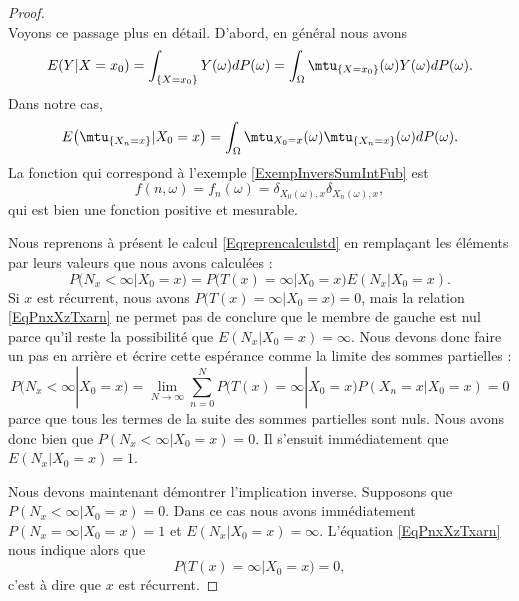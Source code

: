 \begin{proof}
\begin{subequations}
    \end{subequations}
    Voyons ce passage plus en détail. D'abord, en général nous avons
    \begin{equation}
            E(Y|X=x_0)=\int_{\{ X=x_0 \}}Y(\omega)dP(\omega)
            =\int_{\Omega}\mtu_{\{ X=x_0 \}}(\omega)Y(\omega)dP(\omega).
    \end{equation}
    Dans notre cas,
    \begin{equation}
        E\big( \mtu_{\{ X_n=x \}}|X_0=x \big)=\int_{\Omega}\mtu_{X_0=x}(\omega)\mtu_{\{ X_n=x \}}(\omega)dP(\omega).
    \end{equation}
    La fonction qui correspond à l'exemple \ref{ExempInversSumIntFub} est
    \begin{equation}
        f(n,\omega)=f_n(\omega)=\delta_{X_0(\omega),x}\delta_{X_n(\omega),x},
    \end{equation}
    qui est bien une fonction positive et mesurable.

    Nous reprenons à présent le calcul \eqref{Eqreprencalculstd} en remplaçant les éléments par leurs valeurs que nous avons calculées :
    \begin{equation}    \label{EqPnxXzTxarn}
        P(N_x<\infty|X_0=x)=P\big(T(x)=\infty|X_0=x\big)E(N_x|X_0=x).
    \end{equation}
    Si \( x\) est récurrent, nous avons \( P\big( T(x)=\infty|X_0=x \big)=0\), mais la relation \eqref{EqPnxXzTxarn} ne permet pas de conclure que le membre de gauche est nul parce qu'il reste la possibilité que \( E(N_x|X_0=x)=\infty\). Nous devons donc faire un pas en arrière et écrire cette espérance comme la limite des sommes partielles :
    \begin{equation}
        P(N_x<\infty|X_0=x)=\lim_{N\to \infty} \sum_{n=0}^NP\big( T(x)=\infty|X_0=x \big)P(X_n=x|X_0=x)=0
    \end{equation}
    parce que tous les termes de la suite des sommes partielles sont nuls. Nous avons donc bien que \( P(N_x<\infty|X_0=x)=0\). Il s'ensuit immédiatement que \( E(N_x|X_0=x)=1\).

    Nous devons maintenant démontrer l'implication inverse. Supposons que \( P(N_x<\infty|X_0=x)=0\). Dans ce cas nous avons immédiatement \( P(N_x=\infty|X_0=x)=1\) et \( E(N_x|X_0=x)=\infty\). L'équation \eqref{EqPnxXzTxarn} nous indique alors que 
    \begin{equation}
        P\big( T(x)=\infty|X_0=x \big)=0,
    \end{equation}
    c'est à dire que \( x\) est récurrent.
\end{proof}

